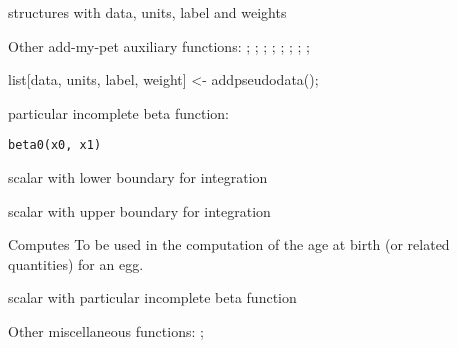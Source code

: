 \documentclass[a4paper]{book}
\begin{document}
%
\begin{Value}
structures with data, units, label and weights
\end{Value}
%
\begin{SeeAlso}\relax
Other add-my-pet auxiliary functions: ;
; ;
; ;
;
;
; 
\end{SeeAlso}
%
\begin{Examples}
\begin{ExampleCode}
list[data, units, label, weight] <- addpseudodata();
\end{ExampleCode}
\end{Examples}
%
\begin{Description}\relax
particular incomplete beta function:
\end{Description}
%
\begin{Usage}
\begin{verbatim}
beta0(x0, x1)
\end{verbatim}
\end{Usage}
%
\begin{Arguments}
\begin{ldescription}
\item[\code{x0}] scalar with lower boundary for integration

\item[\code{x1}] scalar with upper boundary for integration
\end{ldescription}
\end{Arguments}
%
\begin{Details}\relax
Computes
To be used in the computation of the age at birth (or related quantities) for an egg.
\end{Details}
%
\begin{Value}
scalar with particular incomplete beta function
\end{Value}
%
\begin{SeeAlso}\relax
Other miscellaneous functions: ;
\end{SeeAlso}
\end{document}
